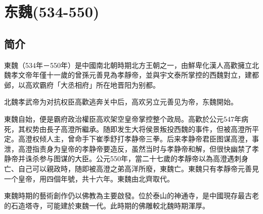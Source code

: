 

\section{东魏\tiny(534-550)}

\subsection{简介}

東魏（534年－550年）是中國南北朝時期北方王朝之一，由鮮卑化漢人高歡擁立北魏孝文帝年僅十一歲的曾孫元善見為孝靜帝，並與宇文泰所掌控的西魏對立，建都邺，以高欢霸府「大丞相府」所在地晋阳为别都。

北魏孝武帝为对抗权臣高歡逃奔关中后，高欢另立元善见为帝，东魏開始。

東魏自始，便是霸府政治權臣高欢架空皇帝掌控整个政局。高歡於公元547年病死，其权势由長子高澄所繼承。随即发生大将侯景叛投西魏的事件，但被高澄所平定。高澄权倾人主，曾命手下崔季舒打孝静帝三拳。后来孝静帝君臣图谋高澄，事泄，高澄指责身为皇帝的孝静帝要造反，虽然当时与孝静帝和解，但很快幽禁了孝静帝并诛杀参与图谋的大臣。公元550年，當二十七歲的孝靜帝以為高澄遇刺身亡、自己可以親政時，随即被高澄之弟高洋所廢，東魏亡。東魏只有孝靜帝元善見一个皇帝，用四個年號，共十六年。東魏由北齊取代。

東魏時期的藝術創作仍以佛教為主要啟發。位於泰山的神通寺，是中國現存最古老的石造塔寺，可能建於東魏一代。此時期的佛雕較北魏時期渾厚。




